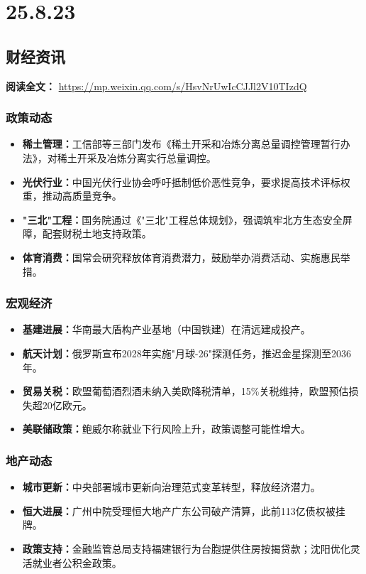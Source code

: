 \chapter{25.8.23}
\section{财经资讯}
\vspace{1em}
\noindent\textbf{阅读全文：} \url{https://mp.weixin.qq.com/s/HsvNrUwIcCJJl2V10TIzdQ}
\subsection{政策动态}
\begin{itemize}
    \item \textbf{稀土管理：}工信部等三部门发布《稀土开采和冶炼分离总量调控管理暂行办法》，对稀土开采及冶炼分离实行总量调控。
    \item \textbf{光伏行业：}中国光伏行业协会呼吁抵制低价恶性竞争，要求提高技术评标权重，推动高质量竞争。
    \item \textbf{"三北"工程：}国务院通过《"三北"工程总体规划》，强调筑牢北方生态安全屏障，配套财税土地支持政策。
    \item \textbf{体育消费：}国常会研究释放体育消费潜力，鼓励举办消费活动、实施惠民举措。
\end{itemize}

\subsection{宏观经济}
\begin{itemize}
    \item \textbf{基建进展：}华南最大盾构产业基地（中国铁建）在清远建成投产。
    \item \textbf{航天计划：}俄罗斯宣布2028年实施"月球-26"探测任务，推迟金星探测至2036年。
    \item \textbf{贸易关税：}欧盟葡萄酒烈酒未纳入美欧降税清单，15\%关税维持，欧盟预估损失超20亿欧元。
    \item \textbf{美联储政策：}鲍威尔称就业下行风险上升，政策调整可能性增大。
\end{itemize}

\subsection{地产动态}
\begin{itemize}
    \item \textbf{城市更新：}中央部署城市更新向治理范式变革转型，释放经济潜力。
    \item \textbf{恒大进展：}广州中院受理恒大地产广东公司破产清算，此前113亿债权被挂牌。
    \item \textbf{政策支持：}金融监管总局支持福建银行为台胞提供住房按揭贷款；沈阳优化灵活就业者公积金政策。
\end{itemize}


